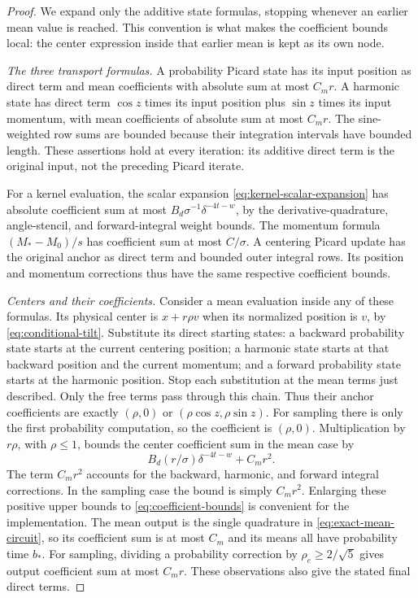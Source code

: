 \begin{proof}
We expand only the additive state formulas, stopping whenever an earlier
mean value is reached.  This convention is what makes the coefficient
bounds local: the center expression inside that earlier mean is kept as
its own node.

\emph{The three transport formulas.}
A probability Picard state has its input position as direct term and
mean coefficients with absolute sum at most $C_mr$.  A harmonic state
has direct term $\cos z$ times its input position plus $\sin z$ times
its input momentum, with mean coefficients of absolute sum at most
$C_mr$.  The sine-weighted row sums are bounded because their integration
intervals have bounded length.  These assertions hold at every iteration:
its additive direct term is the original input, not the preceding
Picard iterate.

For a kernel evaluation, the scalar expansion
\eqref{eq:kernel-scalar-expansion} has absolute coefficient sum at most
$B_d\sigma^{-1}\delta^{-4t-w}$, by the derivative-quadrature,
angle-stencil, and forward-integral weight bounds.  The momentum
formula $(M_*-M_0)/s$ has coefficient sum at most $C/\sigma$.
A centering Picard update has the original anchor as direct term and
bounded outer integral rows.  Its position and momentum corrections
thus have the same respective coefficient bounds.

\emph{Centers and their coefficients.}
Consider a mean evaluation inside any of these formulas.  Its physical
center is $x+r\rho v$ when its normalized position is $v$, by
\eqref{eq:conditional-tilt}.  Substitute its direct starting states:
a backward probability state starts at the current centering position;
a harmonic state starts at that backward position and the current
momentum; and a forward probability state starts at the harmonic
position.  Stop each substitution at the mean terms just described.
Only the free terms pass through this chain.  Thus their anchor
coefficients are exactly $(\rho,0)$ or
$(\rho\cos z,\rho\sin z)$.  For sampling there is only the first
probability computation, so the coefficient is $(\rho,0)$.
Multiplication by $r\rho$, with $\rho\le1$, bounds the center
coefficient sum in the mean case by
\[
 B_d(r/\sigma)\delta^{-4t-w}+C_mr^2.
\]
The term $C_mr^2$ accounts for the backward, harmonic, and forward
integral corrections.  In the sampling case the bound is simply
$C_mr^2$.  Enlarging these positive upper bounds to
\eqref{eq:coefficient-bounds} is convenient for the implementation.
The mean output is the single quadrature in
\eqref{eq:exact-mean-circuit}, so its coefficient sum is at most
$C_m$ and its means all have probability time $b_*$.  For sampling,
dividing a probability correction by $\rho_e\ge2/\sqrt5$ gives
output coefficient sum at most $C_mr$.  These observations also give
the stated final direct terms.


\end{proof}
